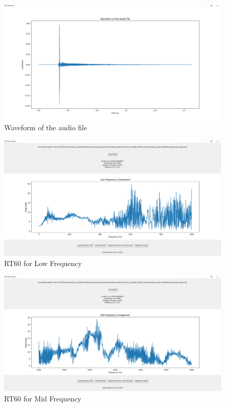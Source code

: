\documentclass[11pt]{article}
\begin{document}
\begin{figure}[h!]
    \centering
    \includegraphics[width=\textwidth]{waveform}
    \caption{Waveform of the audio file}
\end{figure}

\begin{figure}[h!]
    \centering
    \includegraphics[width=\textwidth]{lowFreq}
    \caption{RT60 for Low Frequency}
\end{figure}

\begin{figure}[h!]
    \centering
    \includegraphics[width=\textwidth]{midFreq}
    \caption{RT60 for Mid Frequency}
\end{figure}
\end{document}
